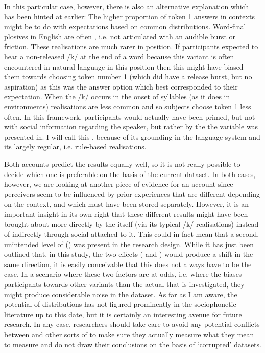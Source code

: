 In this particular case, however, there is also an alternative explanation which has been hinted at earlier: The higher proportion of token 1 answers in  contexts might be to do with expectations based on common  distributions.
Word-final plosives in English are often , i.e. not articulated with an audible burst or friction.
These  realisations are much rarer in  position.
If participants expected to hear a non-released /k/ at the end of a word because this variant is often encountered in natural language in this position then this might have biased them towards choosing token number 1 (which did have a release burst, but no aspiration) as this was the answer option which best corresponded to their expectation.
When the /k/ occurs in the onset of syllables (as it does in  environments)  realisations are less common and so subjects choose token 1 less often.
In this framework, participants would actually have been primed, but not with social information regarding the speaker, but rather by the  the variable was presented in.
I will call this  , because of its grounding in the language system and its largely regular, i.e. rule-based realisations.

Both accounts predict the results equally well, so it is not really possible to decide which one is preferable on the basis of the current dataset.
In both cases, however, we are looking at another piece of evidence for an  account since perceivers seem to be influenced by prior experiences that are different depending on the context, and which must have been stored separately.
However, it is an important insight in its own right that these different results might have been brought about more directly by the  itself (via its typical  /k/ realisations) instead of indirectly through social  attached to it.
This could in fact mean that a second, unintended level of ()  was present in the research design.
While it has just been outlined that, in this study, the two effects ( and  ) would produce a shift in the same direction, it is easily conceivable that this does not always have to be the case.
In a scenario where these two factors are at odds, i.e. where the  biases participants towards other variants than the actual  that is investigated, they might produce considerable noise in the dataset.
As far as I am aware, the  potential of  distributions has not figured prominently in the sociophonetic literature up to this date, but it is certainly an interesting avenue for future research.
In any case, researchers should take care to avoid any potential conflicts between  and other sorts of  to make sure they actually measure what they mean to measure and do not draw their conclusions on the basis of `corrupted' datasets.

